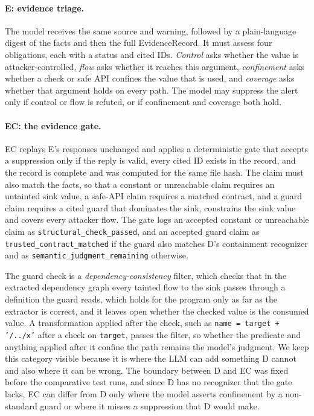 \paragraph{E: evidence triage.}
The model receives the same source and warning, followed by a plain-language digest of the facts and then the full EvidenceRecord. It must assess four obligations, each with a status and cited IDs. \emph{Control} asks whether the value is attacker-controlled, \emph{flow} asks whether it reaches this argument, \emph{confinement} asks whether a check or safe API confines the value that is used, and \emph{coverage} asks whether that argument holds on every path. The model may suppress the alert only if control or flow is refuted, or if confinement and coverage both hold.

\paragraph{EC: the evidence gate.}
EC replays E's responses unchanged and applies a deterministic gate that accepts a suppression only if the reply is valid, every cited ID exists in the record, and the record is complete and was computed for the same file hash. The claim must also match the facts, so that a constant or unreachable claim requires an untainted sink value, a safe-API claim requires a matched contract, and a guard claim requires a cited guard that dominates the sink, constrains the sink value and covers every attacker flow. The gate logs an accepted constant or unreachable claim as \texttt{structural\_check\_passed}, and an accepted guard claim as \texttt{trusted\_contract\_matched} if the guard also matches D's containment recognizer and as \texttt{semantic\_judgment\_remaining} otherwise.

The guard check is a \emph{dependency-consistency} filter, which checks that in the extracted dependency graph every tainted flow to the sink passes through a definition the guard reads, which holds for the program only as far as the extractor is correct, and it leaves open whether the checked value is the consumed value. A transformation applied after the check, such as \texttt{name = target + '/../x'} after a check on \texttt{target}, passes the filter, so whether the predicate and anything applied after it confine the path remains the model's judgment. We keep this category visible because it is where the LLM can add something D cannot and also where it can be wrong. The boundary between D and EC was fixed before the comparative test runs, and since D has no recognizer that the gate lacks, EC can differ from D only where the model asserts confinement by a non-standard guard or where it misses a suppression that D would make.


